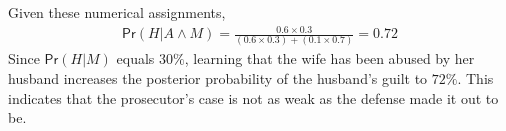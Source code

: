 \documentclass{article}
\newcommand{\pr}{\mathsf{Pr}}
\begin{document}
Given these numerical assignments, %
%
\begin{align*}
\pr(H\vert A \wedge M) 
 = \frac{0.6 \times 0.3}{(0.6 \times 0.3)+(0.1 \times 0.7)} = 0.72
\end{align*}
%
Since $\pr(H\vert M)$ equals $30\%$, learning that the wife has been abused by her husband  increases the posterior probability of the husband's guilt  to $72\%$. This indicates that the prosecutor's case is not as weak as the defense made it out to be.  














\end{document}
